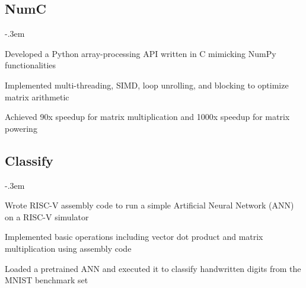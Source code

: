 \documentclass{article}
\let\olditemize=\itemize \let\endolditemize=\enditemize
\renewenvironment{itemize}{\olditemize[topsep=0em] \itemsep-.3em}{\endolditemize}
\begin{document}
\subsection{NumC}
\begin{itemize}
  \item Developed a Python array-processing API written in C mimicking NumPy functionalities
  \item Implemented multi-threading, SIMD, loop unrolling, and blocking to optimize matrix arithmetic
  \item Achieved 90x speedup for matrix multiplication and 1000x speedup for matrix powering
\end{itemize}


\subsection{Classify}
\begin{itemize}
  \item Wrote RISC-V assembly code to run a simple Artificial Neural Network (ANN) on a RISC-V simulator
  \item Implemented basic operations including vector dot product and matrix multiplication using assembly code
  \item Loaded a pretrained ANN and executed it to classify handwritten digits from the MNIST benchmark set
\end{itemize}

\end{document}
